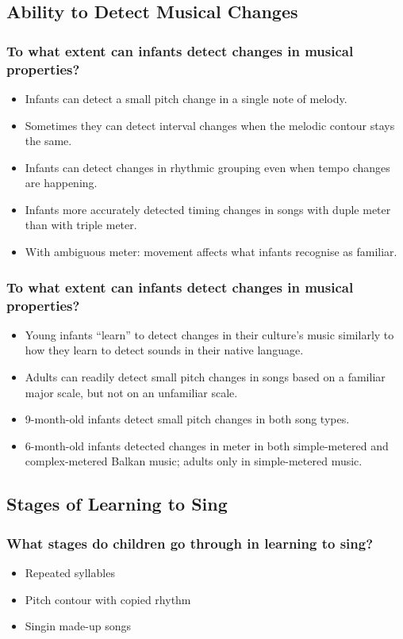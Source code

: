\documentclass{beamer}
\begin{document}
\subsection*{Ability to Detect Musical Changes}

\begin{frame}
	\frametitle{To what extent can infants detect changes in musical properties?}
	\begin{itemize}
		\item Infants can detect a small pitch change in a single note of melody.
		\item Sometimes they can detect interval changes when the melodic contour stays the same.
		\item Infants can detect changes in rhythmic grouping even when tempo changes are happening.
		\item Infants more accurately detected timing changes in songs with duple meter than with triple meter.
		\item With ambiguous meter: movement affects what infants recognise as familiar.
	\end{itemize}
\end{frame}

\begin{frame}
	\frametitle{To what extent can infants detect changes in musical properties?}
	\begin{itemize}
		\item Young infants ``learn'' to detect changes in their culture's music similarly to how they learn to detect sounds in their native language.
		\item Adults can readily detect small pitch changes in songs based on a familiar major scale, but not on an unfamiliar scale.
		\pause
		\item 9-month-old infants detect small pitch changes in both song types.
		\item 6-month-old infants detected changes in meter in both simple-metered and complex-metered Balkan music; adults only in simple-metered music.
	\end{itemize}
\end{frame}

\subsection*{Stages of Learning to Sing}

\begin{frame}
	\frametitle{What stages do children go through in learning to sing?}
	\begin{itemize}
		\item Repeated syllables
		\item Pitch contour with copied rhythm
		\item Singin made-up songs
	\end{itemize}
\end{frame}
\end{document}
